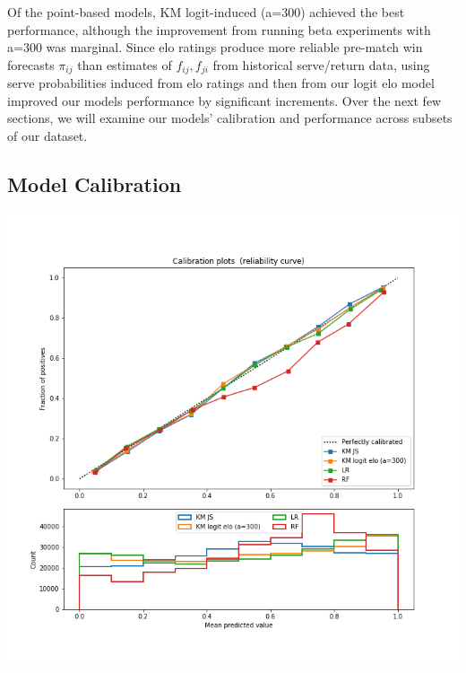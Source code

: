 \documentclass[chapterprefix=false]{report}
\begin{document}

Of the point-based models, KM logit-induced (a=300) achieved the best performance, although the improvement from running beta experiments with a=300 was marginal. Since elo ratings produce more reliable pre-match win forecasts $\pi_{ij}$ than estimates of $f_{ij},f_{ji}$ from historical serve/return data, using serve probabilities induced from elo ratings and then from our logit elo model improved our models performance by significant increments. Over the next few sections, we will examine our models' calibration and performance across subsets of our dataset.


\subsection{Model Calibration}

\hspace*{-.5cm}\includegraphics[scale=.6]{calibration_plot}
\end{document}
